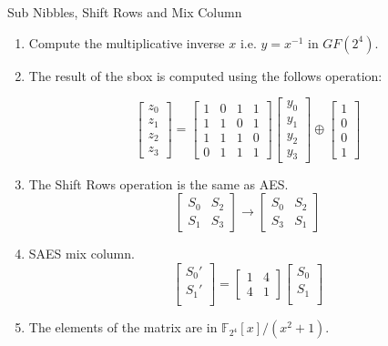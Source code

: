 \begin{frame}{Sub Nibbles, Shift Rows and Mix Column}
\begin{enumerate}
    \item Compute the multiplicative inverse $x$ i.e. $y = x^{-1}$ in $GF(2^4)$.
    \pause
    \item The result of the sbox is computed using the follows operation:
    
    \begin{equation}\label{eq:sn}
        \begin{bmatrix}
        z_0\\
        z_1\\ 
        z_2\\
        z_3
        \end{bmatrix} = 
        \begin{bmatrix}
        1 & 0 & 1 & 1\\
        1 & 1 & 0 & 1 \\
        1 & 1 & 1 & 0 \\
        0 & 1 & 1 & 1
        \end{bmatrix} 
        \begin{bmatrix}
        y_0 \\ y_1\\
        y_2 \\ y_3
        \end{bmatrix} 
        \oplus
        \begin{bmatrix}
        1  \\ 0\\
        0 \\ 1
        \end{bmatrix} 
    \end{equation}
    \pause
    \item The Shift Rows operation is the same as AES.
    \[
    \begin{bmatrix}
    S_0 & S_2\\
    S_1 & S_3
    \end{bmatrix} \longrightarrow
    \begin{bmatrix}
    S_0 & S_2\\
    S_3 & S_1
    \end{bmatrix} 
\]
\pause
\item SAES mix column.
\[
    \begin{bmatrix}
    S_0'\\
    S_1'\\ 
    \end{bmatrix} = 
    \begin{bmatrix}
    1 & 4 \\
    4 & 1 
    \end{bmatrix}
    \begin{bmatrix}
    S_0\\
    S_1\\ 
    \end{bmatrix}
\]
\item The elements of the matrix are in $\mathbb{F}_{2^4}[x]/(x^2 + 1)$.
\end{enumerate}    
\end{frame}
